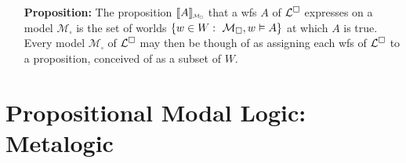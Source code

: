 \documentclass[a4paper, 11pt]{article} %
\newcommand*{\Scale}[2][4]{\scalebox{#1}{$#2$}}%
\begin{document}
\begin{enumerate}[leftmargin=1.2in]
\begin{small}
\begin{itemize}[leftmargin=.36in]
		      \end{itemize}
	      \end{small}
	\item[\bf Proposition:] The proposition $\interpret{A}_{\Scale[0.5]{\mathcal{M}_\square}}$ that a wfs ${A}$ of $\mathcal{L}^{\square}$ expresses on a model $\mathcal{M}_\square$ is the set of worlds $\lbrace w\in W: ~\mathcal{M}_\square,w\vDash  A\rbrace$ at which ${A}$ is true. Every model $\mathcal{M}_\square$ of $\mathcal{L}^{\square}$ may then be though of as assigning each wfs of $\mathcal{L}^{\square}$ to a proposition, conceived of as a subset of $W$.
\end{enumerate}




\section*{\sc Propositional Modal Logic: Metalogic}
\end{document}
